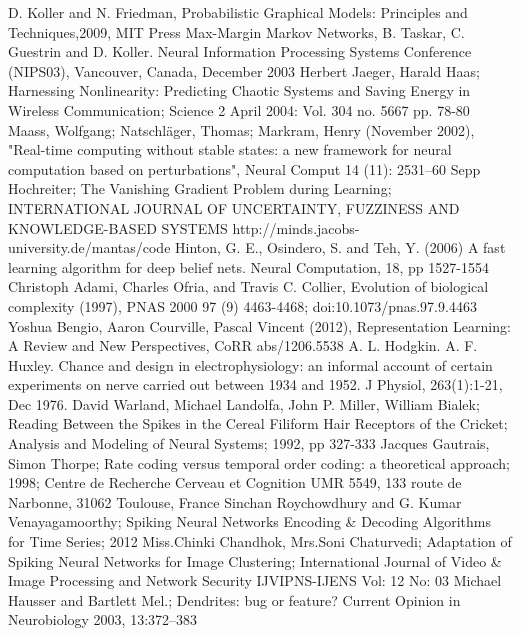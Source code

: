 \documentclass[a4paper,10pt]{article}
\begin{document}
\newpage
{}
\begin{thebibliography}{9}
D. Koller and N. Friedman, Probabilistic Graphical Models: Principles and Techniques,2009, MIT Press
Max-Margin Markov Networks,  B. Taskar, C. Guestrin and D. Koller. Neural Information Processing Systems Conference (NIPS03), Vancouver, Canada, December 2003
Herbert Jaeger, Harald Haas; Harnessing Nonlinearity: Predicting Chaotic Systems and Saving Energy in Wireless Communication; 
Science 2 April 2004: Vol. 304 no. 5667 pp. 78-80 
Maass, Wolfgang; Natschläger, Thomas; Markram, Henry (November 2002), "Real-time computing without stable states: a new framework for neural computation based on perturbations", Neural Comput 14 (11): 2531–60
Sepp Hochreiter; The Vanishing Gradient Problem during Learning; INTERNATIONAL JOURNAL OF UNCERTAINTY, FUZZINESS AND KNOWLEDGE-BASED SYSTEMS
http://minds.jacobs-university.de/mantas/code
Hinton, G. E., Osindero, S. and Teh, Y. (2006)
A fast learning algorithm for deep belief nets.
Neural Computation, 18, pp 1527-1554
Christoph Adami, Charles Ofria, and Travis C. Collier, Evolution of biological complexity (1997), PNAS 2000 97 (9) 4463-4468; doi:10.1073/pnas.97.9.4463
Yoshua Bengio, Aaron Courville, Pascal Vincent (2012), Representation Learning: A Review and New Perspectives, CoRR abs/1206.5538 
A. L. Hodgkin. A. F. Huxley. Chance and design in electrophysiology: an informal account of certain experiments on nerve carried out between 1934 and 1952. J Physiol, 263(1):1-21, Dec 1976.
David Warland, Michael Landolfa, John P. Miller, William Bialek; Reading Between the Spikes in the Cereal Filiform Hair Receptors of the Cricket; Analysis and Modeling of Neural Systems; 1992, pp 327-333
Jacques Gautrais, Simon Thorpe; Rate coding versus temporal order coding: a theoretical approach; 1998; Centre de Recherche Cerveau et Cognition UMR 5549, 133 route de Narbonne, 31062 Toulouse, France
Sinchan Roychowdhury and G. Kumar Venayagamoorthy; Spiking Neural Networks Encoding \& Decoding Algorithms for Time Series; 2012
Miss.Chinki Chandhok, Mrs.Soni Chaturvedi; Adaptation of Spiking Neural Networks for Image Clustering; International Journal of Video \& Image Processing and Network Security IJVIPNS-IJENS Vol: 12 No: 03
Michael Hausser and Bartlett Mel.; Dendrites: bug or feature? Current Opinion in Neurobiology 2003, 13:372–383

\end{thebibliography}
\end{document}
